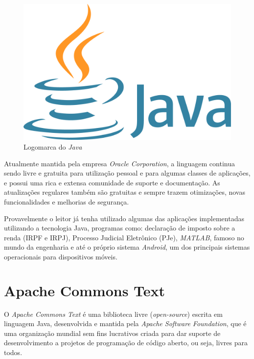 \documentclass[
	12pt,			%
	openright,		%
	oneside,	
	a4paper,		%
	english,		%
	brazil			%
]{abntex2/abntex2}  %
\begin{document}
			\begin{figure}[ht]
				\begin{center}
				
					\caption{Logomarca do \textit{Java}}
					\includegraphics[scale=0.04]{img/java-logo}
					
				\end{center}
			\end{figure}
		
			Atualmente mantida pela empresa \textit{Oracle Corporation}, a linguagem continua sendo livre e gratuita para utilização pessoal e para algumas classes de aplicações, e possui uma rica e extensa comunidade de suporte e documentação. As atualizações regulares também são gratuitas e sempre trazem otimizações, novas funcionalidades e melhorias de segurança.

			Provavelmente o leitor já tenha utilizado algumas das aplicações implementadas utilizando a tecnologia Java, programas como: declaração de imposto sobre a renda (IRPF e IRPJ), Processo Judicial Eletrônico (PJe), \textit{MATLAB}, famoso no mundo da engenharia e até o próprio sistema \textit{Android}, um dos principais sistemas operacionais para dispositivos móveis.
		
		\section{Apache Commons Text\texttrademark} \label{commons-text}
		
			O \textit{Apache Commons Text\texttrademark} \cite{commons-text} é uma biblioteca livre (\textit{open-source}) escrita em linguagem Java, desenvolvida e mantida pela \textit{Apache Software Foundation}, que é uma organização mundial sem fins lucrativos criada para dar suporte de desenvolvimento a projetos de programação de código aberto, ou seja, livres para todos.
			
\end{document}
